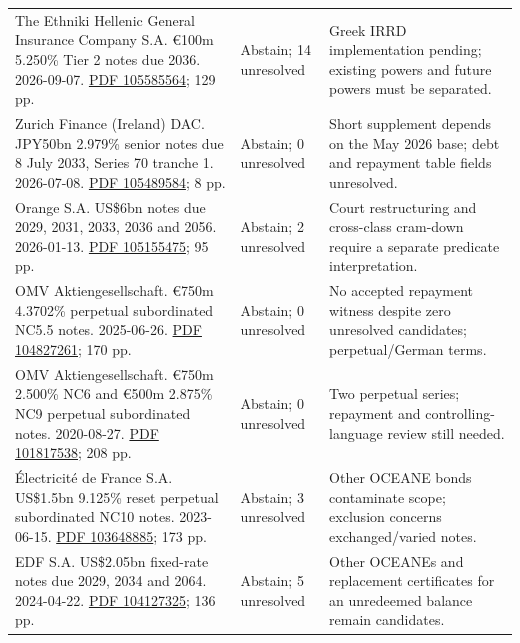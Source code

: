 {\begin{longtable}{P{0.44\textwidth}P{0.12\textwidth}P{0.34\textwidth}}
The Ethniki Hellenic General Insurance Company S.A. €100m 5.250\% Tier 2 notes due 2036. 2026-09-07. \href{../prospectus/difficulty-2026-10-04/pdfs/case-105585564.pdf}{PDF 105585564}; 129 pp. & Abstain; 14 unresolved & Greek IRRD implementation pending; existing powers and future powers must be separated. \\

Zurich Finance (Ireland) DAC. JPY50bn 2.979\% senior notes due 8 July 2033, Series 70 tranche 1. 2026-07-08. \href{../prospectus/difficulty-2026-10-04/pdfs/case-105489584.pdf}{PDF 105489584}; 8 pp. & Abstain; 0 unresolved & Short supplement depends on the May 2026 base; debt and repayment table fields unresolved. \\

Orange S.A. US\$6bn notes due 2029, 2031, 2033, 2036 and 2056. 2026-01-13. \href{../prospectus/difficulty-2026-10-04/pdfs/case-105155475.pdf}{PDF 105155475}; 95 pp. & Abstain; 2 unresolved & Court restructuring and cross-class cram-down require a separate predicate interpretation. \\

OMV Aktiengesellschaft. €750m 4.3702\% perpetual subordinated NC5.5 notes. 2025-06-26. \href{../prospectus/difficulty-2026-10-04/pdfs/case-104827261.pdf}{PDF 104827261}; 170 pp. & Abstain; 0 unresolved & No accepted repayment witness despite zero unresolved candidates; perpetual/German terms. \\

OMV Aktiengesellschaft. €750m 2.500\% NC6 and €500m 2.875\% NC9 perpetual subordinated notes. 2020-08-27. \href{../prospectus/difficulty-2026-10-04/pdfs/case-101817538.pdf}{PDF 101817538}; 208 pp. & Abstain; 0 unresolved & Two perpetual series; repayment and controlling-language review still needed. \\

Électricité de France S.A. US\$1.5bn 9.125\% reset perpetual subordinated NC10 notes. 2023-06-15. \href{../prospectus/difficulty-2026-10-04/pdfs/case-103648885.pdf}{PDF 103648885}; 173 pp. & Abstain; 3 unresolved & Other OCEANE bonds contaminate scope; exclusion concerns exchanged/varied notes. \\

EDF S.A. US\$2.05bn fixed-rate notes due 2029, 2034 and 2064. 2024-04-22. \href{../prospectus/difficulty-2026-10-04/pdfs/case-104127325.pdf}{PDF 104127325}; 136 pp. & Abstain; 5 unresolved & Other OCEANEs and replacement certificates for an unredeemed balance remain candidates. \\


\end{longtable}}
